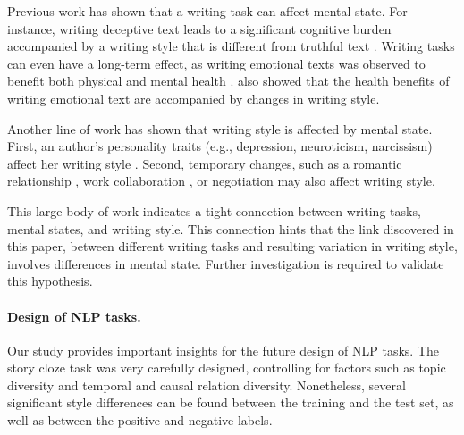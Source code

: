 \documentclass[11pt,a4paper]{article}
\newcommand{\com}[1]{}
\newcommand{\shortv}[1]{}
\begin{document}
Previous work has shown that a writing task can affect mental state.
For instance, writing deceptive text leads to a significant cognitive
burden accompanied by a writing style that is different from truthful
text \cite{Newman:2003,Banerjee:2014}.
Writing tasks can even have a long-term effect,
as writing emotional texts was observed to benefit both physical and mental health \cite{Lepore:2002,Frattaroli:2006}. 
\citet{Campbell:2003} also showed that the health benefits of writing emotional text are accompanied by changes in writing style\shortv{, mostly in the use of pronouns}.

Another line of work has shown that writing style is affected by mental state.
First, an author's personality traits (e.g., depression, neuroticism, narcissism) affect her writing style \cite{schwartz2013personality,Ireland:2014b}.
Second, temporary changes, such as a romantic relationship \cite{Ireland:2011,Bowen:2016}, work collaboration \cite{Tausczik:2009,Gonzales:2009}, or negotiation \cite{Ireland:2014} may also affect writing style.
\shortv{Finally, writing style can also change from one sentence to another, for instance between positive and negative text \cite{Davidov:2010} or when writing sarcastic text \cite{Tsur:2010}.} 

This large body of work indicates a tight connection between writing
tasks, mental states, and \shortv{variation in }writing style.
This connection hints that the link discovered in this paper, between
different writing tasks and resulting variation in writing style,
involves differences in mental state. 
Further investigation is required \shortv{in order to further}to validate this hypothesis.


\paragraph{Design of NLP tasks.}
Our study  provides important insights for the future design of NLP tasks. 
The story cloze task was very carefully designed, controlling for factors such
as topic diversity and temporal and causal relation diversity.\com{,  were controlled for \cite{Mostafazadeh:2016}. }\shortv{The authors also made sure each pair of endings was written by the
same author, partly in order to avoid author-specific style effects.}
 Nonetheless\shortv{, despite these efforts}, several significant style
 differences can be found between the training and the test set, as well as between the positive and negative labels. 
 
\end{document}

